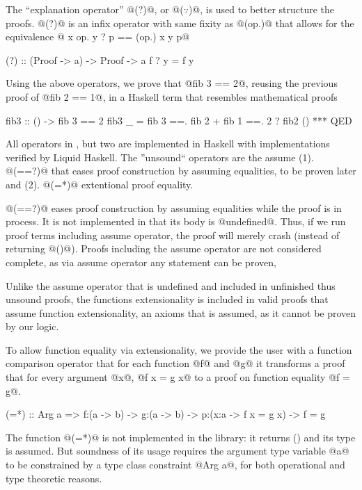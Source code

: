 %
The ``explanation operator'' @(?)@, or @($\because$)@,
is used to better structure the proofs.
%
@(?)@ is an infix operator with same fixity as @(op.)@
that allows for the equivalence
%
@ x op. y ? p == (op.) x y p@
%
\begin{code}
  (?) :: (Proof -> a) -> Proof -> a
  f ? y = f y
\end{code}

%
Using the above operators,
we prove that @fib 3 == 2@,
reusing the previous proof of @fib 2 == 1@,
in a Haskell term that resembles mathematical proofs
%
\begin{code}
  fib3 :: () ->  {fib 3 == 2}
  fib3 _
    =   fib 3
    ==. fib 2 + fib 1
    ==. 2             ? fib2 ()
    *** QED
\end{code}


All operators in \libname, but two are implemented in Haskell
with implementations verified by Liquid Haskell.
%
The ''unsound`` operators are the assume
(1). @(==?)@ that eases proof construction by assuming equalities, to be proven later
and (2). @(=*)@ extentional proof equality.

 @(==?)@ eases proof construction by
assuming equalities while the proof is in process.
%
It is not implemented in that its body is @undefined@.
%
Thus, if we run proof terms including assume operator, the proof will merely crash
(instead of returning @()@).
%
Proofs including the assume operator are not considered complete,
as via assume operator any statement can be proven,

Unlike the assume operator that is undefined and
included in unfinished thus unsound proofs,
the functions extensionality is included in valid proofs
that assume function extensionality, an axioms that is assumed,
as it cannot be proven by our logic.

To allow function equality via extensionality,
we provide the user with a function comparison operator
that for each function @f@ and @g@ it transforms a proof
that for every argument @x@, @f x = g x@ to a proof
on function equality @f = g@.
\begin{code}
(=*) :: Arg a => f:(a -> b) -> g:(a -> b)
     -> p:(x:a -> {f x = g x})
     -> {f = g}
\end{code}
%
The function @(=*)@ is not implemented in the library:
it returns () and its type is assumed.
%
But soundness of its usage requires the argument type variable @a@
to be constrained by a type class constraint @Arg a@,
for both operational and type theoretic reasons.
%

